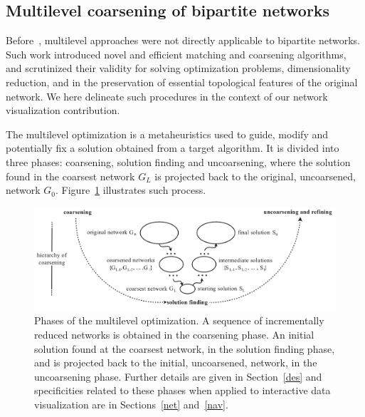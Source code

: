 \documentclass[runningheads]{llncs}
\begin{document}
\subsection{Multilevel coarsening of bipartite networks}
Before~\cite{alan2}, multilevel approaches were not directly applicable to bipartite networks.
Such work introduced novel and efficient matching and coarsening algorithms,
and scrutinized their validity for solving optimization problems, dimensionality reduction,
and in the preservation of essential topological features of the original network.
We here delineate such procedures in the context of our network visualization contribution.

The multilevel optimization is a metaheuristics used to guide,
modify and potentially fix a solution obtained from a target algorithm.
It is divided into three phases: coarsening, solution finding and uncoarsening,
where the solution found in the coarsest network $G_L$ is projected back to the original,
uncoarsened, network $G_0$.
Figure~\ref{mlf} illustrates such process.

\begin{figure}\centering
 \includegraphics[width=\textwidth]{mlf}
  \caption{Phases of the multilevel optimization.
  A sequence of incrementally reduced networks is obtained in the coarsening phase.
  An initial solution found at the coarsest network, in the solution finding phase,
  and is projected back to the initial, uncoarsened, network, in the uncoarsening phase.
  Further details are given in Section~\ref{des} and specificities related to these
  phases when applied to interactive data visualization are in Sections~\ref{net} and~\ref{nav}.
  }\label{mlf}
\end{figure}
\end{document}
